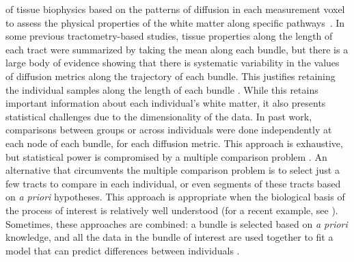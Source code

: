 \documentclass[10pt,letterpaper]{article}
\begin{document}
of tissue biophysics based on the patterns of diffusion in each measurement
voxel to assess the physical properties of the white matter along specific
pathways~\cite{Jones2005-yq, Bells2011-cf}.
In some previous tractometry-based studies, tissue properties along the
length of each tract were summarized by taking the mean along each
bundle, but there is a large body of evidence showing that there is
systematic variability in the values of diffusion metrics along the
trajectory of each bundle. This justifies retaining the individual
samples along the length of each bundle \cite{yeatman2012tract,
colby2012, ODonnell2009-uu}. While this retains important information
about each individual's white matter, it also presents statistical
challenges due to the dimensionality of the data. In past work,
comparisons between groups or across individuals were done
independently at each node of each bundle, for each
diffusion metric. This approach is exhaustive, but
statistical power is compromised by a multiple comparison problem
\cite{colby2012, Nichols2002-zu, Nichols2003-yy}. An alternative that
circumvents the multiple comparison problem is to select just a few
tracts to compare in each individual, or even
segments of these tracts based on \emph{a priori} hypotheses. This
approach is appropriate when the biological basis of the process
of interest is relatively well understood (for a recent example, see
\cite{huber2018rapid}). Sometimes, these approaches are combined: a
bundle is selected based on \emph{a priori} knowledge, and all the data
in the bundle of interest are used together to fit a model that can
predict differences between individuals \cite{dayan2016profilometry}.
\end{document}
